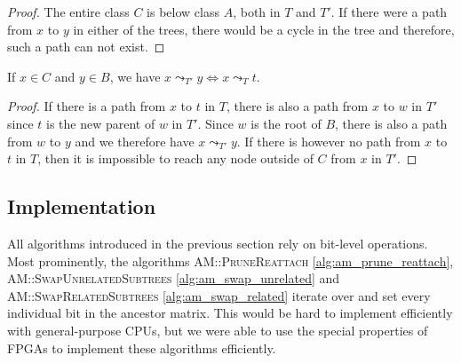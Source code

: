 \begin{proof}
    The entire class $C$ is below class $A$, both in $T$ and $T'$. If there were a path from $x$ to $y$ in either of the trees, there would be a cycle in the tree and therefore, such a path can not exist.
\end{proof}

\begin{lemma}
    \label{lem:related_swap_cb}
    If $x \in C$ and $y \in B$, we have $x \leadsto_{T'} y \Leftrightarrow x \leadsto_T t$.
\end{lemma}

\begin{proof}
    If there is a path from $x$ to $t$ in $T$, there is also a path from $x$ to $w$ in $T'$ since $t$ is the new parent of $w$ in $T'$. Since $w$ is the root of $B$, there is also a path from $w$ to $y$ and we therefore have $x \leadsto_{T'} y$. If there is however no path from $x$ to $t$ in $T$, then it is impossible to reach any node outside of $C$ from $x$ in $T'$.
\end{proof}

\subsection{Implementation}
\label{sec:encoding_implementation}

All algorithms introduced in the previous section rely on bit-level operations. Most prominently, the algorithms \textsc{AM::PruneReattach} \ref{alg:am_prune_reattach}, \textsc{AM::SwapUnrelatedSubtrees} \ref{alg:am_swap_unrelated} and \textsc{AM::SwapRelatedSubtrees} \ref{alg:am_swap_related} iterate over and set every individual bit in the ancestor matrix. This would be hard to implement efficiently with general-purpose \acp{CPU}, but we were able to use the special properties of \acp{FPGA} to implement these algorithms efficiently.

